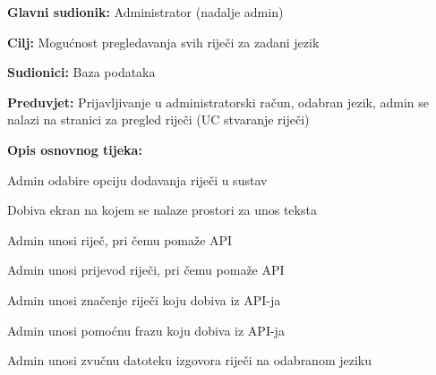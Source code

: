 \noindent {}
\begin{packed_item}

	\item \textbf{Glavni sudionik: } Administrator (nadalje admin)
	\item \textbf{Cilj: } Mogućnost pregledavanja svih riječi za zadani jezik
	\item \textbf{Sudionici: } Baza podataka
	\item \textbf{Preduvjet: } Prijavljivanje u administratorski račun, odabran jezik, admin se nalazi na stranici za pregled riječi (UC stvaranje riječi)	
	\item  \textbf{Opis osnovnog tijeka:}
	
	\item[] \begin{packed_enum}
		
		\item Admin odabire opciju dodavanja riječi u sustav
		\item Dobiva ekran na kojem se nalaze prostori za unos teksta
		\item Admin unosi riječ, pri čemu pomaže API
		\item Admin unosi prijevod riječi, pri čemu pomaže API
		\item Admin unosi značenje riječi koju dobiva iz API-ja
		\item Admin unosi pomoćnu frazu koju dobiva iz API-ja
		\item Admin unosi zvučnu datoteku izgovora riječi na odabranom jeziku

	\end{packed_enum}
	
\end{packed_item}


